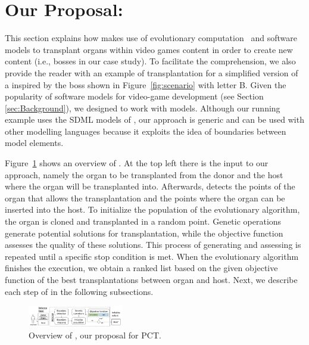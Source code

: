 \section{Our Proposal: \ApproachName{} } 
\label{sec:Approach}
This section explains  how \ApproachName{}  makes use of evolutionary computation~\cite{dumitrescu2000evolutionary} and software models to transplant organs within video games content in order to create new content (i.e., \CaseStudy{} bosses in our case study). To facilitate the comprehension, we also provide the reader with an example of transplantation for a simplified version of a  \CaseStudy{}   inspired by the  boss shown in Figure~\ref{fig:scenario} with letter B. Given the popularity of software models for video-game development (see Section \ref{sec:Background}),  we designed \ApproachName{}  to work with models. Although our running example uses the SDML models of \CaseStudy{}, our approach is generic and can be used with other modelling languages because it exploits the idea of boundaries between model elements.

Figure~\ref{fig:approach} shows an overview of \ApproachName{}. At the top left there is the input to our approach, namely the organ to be transplanted from the donor and the host where the organ will be transplanted into. Afterwards, \ApproachName{} detects the points of the organ that allows the transplantation and the points where the organ can be inserted into the host. To initialize the population of the evolutionary algorithm, the organ is cloned and transplanted in a random point. Genetic operations generate potential solutions for transplantation, while the objective function assesses the quality of these solutions. This process of generating and assessing is repeated until a specific stop condition is met. When the evolutionary algorithm finishes the execution, we obtain a ranked list based on the given objective function of the best transplantations between organ and host. Next, we describe each step of \ApproachName{} in the following subsections.


\begin{figure}[tb]
    \centering
    \includegraphics[width=0.37\textwidth]{Figures/overview.png}
    \caption{Overview of  \ApproachName{}, our proposal for PCT.}
    \label{fig:approach}
\end{figure}


